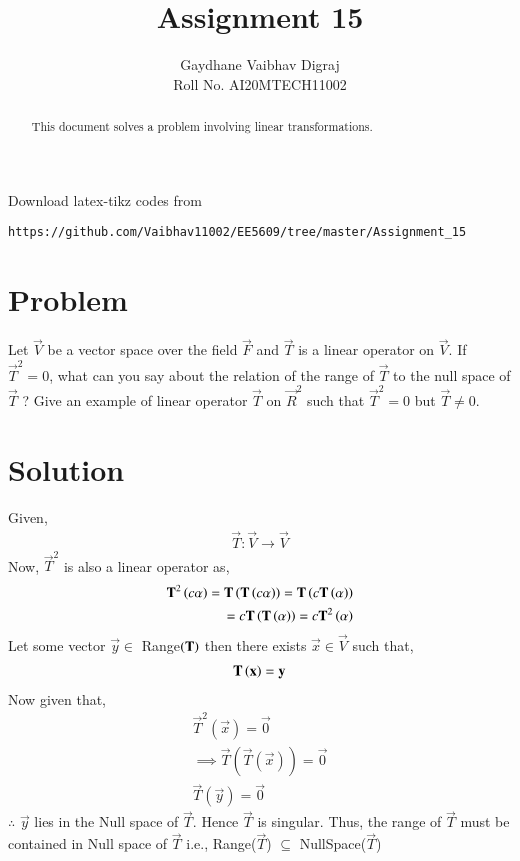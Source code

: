 \documentclass[journal,12pt,twocolumn]{IEEEtran}
\begin{document}
     \def\rightbox#1{\makebox[0in][r]{#1}}
     \def\centbox#1{\makebox[0in]{#1}}
     \def\topbox#1{\raisebox{-\baselineskip}[0in][0in]{#1}}
     \def\midbox#1{\raisebox{-0.5\baselineskip}[0in][0in]{#1}}
\vspace{3cm}
\title{Assignment 15}
\author{Gaydhane Vaibhav Digraj \\ Roll No. AI20MTECH11002}
\maketitle
\newpage
\bigskip
\renewcommand{\thefigure}{\theenumi}
\renewcommand{\thetable}{\theenumi}
\begin{abstract}
This document solves a problem involving linear transformations.
\end{abstract}
%
Download latex-tikz codes from 
%
\begin{lstlisting}
https://github.com/Vaibhav11002/EE5609/tree/master/Assignment_15
\end{lstlisting}
%
\section{Problem}
Let $\vec{V}$ be a vector space over the field $\vec{F}$ and $\vec{T}$ is a linear operator on $\vec{V}$. If $\vec{T}^2=0$, what can you say about the relation of the range of $\vec{T}$ to the null space of $\vec{T}$ ?
Give an example of linear operator $\vec{T}$ on $\vec{R}^2$ such that $\vec{T}^2=0$ but $\vec{T}\ne0$.

\section{Solution}
Given, 
\begin{align}
    \vec{T} : \vec{V} \xrightarrow{} \vec{V}
\end{align}
Now, $\vec{T}^2$ is also a linear operator as,
\begin{align}
    \mathbf{T}^2\left(c\alpha\right) = \mathbf{T}\left(\mathbf{T}\left(c\alpha\right)\right) = \mathbf{T}\left(c\mathbf{T}\left(\alpha\right)\right) \\
    = c\mathbf{T}\left(\mathbf{T}\left(\alpha\right)\right) = c\mathbf{T}^2\left(\alpha\right) 
\end{align}
Let some vector $\vec{y}\in $ Range$\left(\mathbf{T}\right)$ then there exists $\vec{x} \in \vec{V}$ such that,
\begin{align}
    \mathbf{T}\left(\mathbf{x}\right) = \mathbf{y}
\end{align}
Now given that,
\begin{align}
    \vec{T}^2(\vec{x}) = \vec{0} \\
    \implies \vec{T}(\vec{T}(\vec{x})) = \vec{0}\\
    \vec{T}(\vec{y}) = \vec{0}
\end{align}
$\therefore$ $\vec{y}$ lies in the Null space of $\vec{T}$. Hence $\vec{T}$ is singular. Thus, the range of $\vec{T}$ must be contained in Null space of $\vec{T}$ i.e.,
Range($\vec{T}$) $\subseteq$ NullSpace($\vec{T}$)
\end{document}
